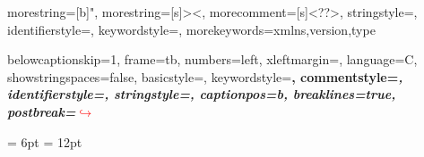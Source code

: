 \usepackage{multicol}
\usepackage{comment}
\usepackage{textcomp}
\usepackage{tabu}
\usepackage{caption}
\usepackage[scaled]{helvet}
\usepackage[T1]{fontenc}
\usepackage[utf8]{inputenc}
\usepackage{sansmath}
\usepackage{textpos}
\usepackage{ifxetex}
\usepackage{stackengine}
\usepackage{tabularx,longtable,multirow,subfigure,caption} %
\usepackage{fncylab} %
\usepackage{fancyhdr}
\usepackage{color}

\usepackage{listings}
\usepackage{xcolor}
 

{
  morestring=[b]",
  morestring=[s]{>}{<},
  morecomment=[s]{<?}{?>},
  stringstyle=\color{black},
  identifierstyle=\color{darkblue},
  keywordstyle=\color{cyan},
  morekeywords={xmlns,version,type}%
}
 
 {
  belowcaptionskip=1\baselineskip,
  frame=tb,
  numbers=left,
  xleftmargin=\parindent,
  language=C,
  showstringspaces=false,
  basicstyle=\footnotesize\ttfamily,
  keywordstyle=\bfseries\color{green!40!black},
  commentstyle=\itshape\color{purple!40!black},
  identifierstyle=\color{blue},
  stringstyle=\color{orange},
  captionpos=b,
  breaklines=true, postbreak=\mbox{\textcolor{red}{$\hookrightarrow$}\space}
}
\lstset{escapechar=£,style=C}
\usepackage{tcolorbox}

\usepackage[ugly]{units}
\usepackage{url}
\usepackage{float}
\usepackage{csquotes}
\usepackage[english]{babel}
\usepackage{amsmath}
\usepackage{bm}
\usepackage{mathtools}
\DeclarePairedDelimiter\ceil{\lceil}{\rceil}
\DeclarePairedDelimiter\floor{\lfloor}{\rfloor}
\usepackage{graphicx}
\usepackage[colorinlistoftodos]{todonotes}
\usepackage{epstopdf} %
\usepackage{array}
\usepackage{latexsym}
\usepackage{etoolbox}
\usepackage{enumerate} %
\usepackage{enumitem}
\usepackage{tablefootnote}
\usepackage{booktabs}
\usepackage{tcolorbox}
\usepackage{silence}
\usepackage{multicol}
\usepackage{multirow}
\usepackage{pbox, cellspace}
\usepackage{tikz}
\usepackage{chemformula}
\let\ce\ch
\usepackage{balance} 
\usepackage{etoolbox}
\usetikzlibrary{shapes,snakes}

\cellspacetoplimit = 6pt
\cellspacebottomlimit = 12pt
\usepackage{seqsplit}
\let\oldseqsplit\seqsplit%
\renewcommand{\seqsplit}{%
  \expandafter\oldseqsplit\expandafter}%


